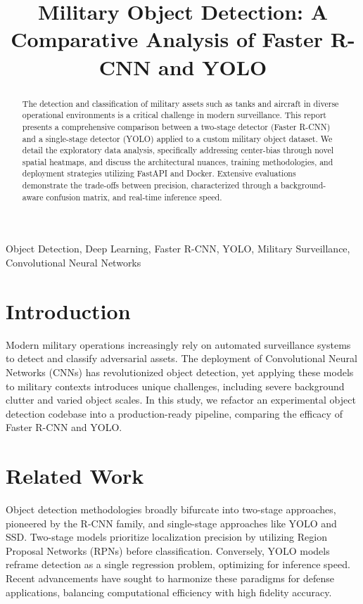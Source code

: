 \documentclass[conference]{IEEEtran}
\begin{document}
\title{Military Object Detection: A Comparative Analysis of Faster R-CNN and YOLO}

\author{
}

\maketitle

\begin{abstract}
The detection and classification of military assets such as tanks and aircraft in diverse operational environments is a critical challenge in modern surveillance. This report presents a comprehensive comparison between a two-stage detector (Faster R-CNN) and a single-stage detector (YOLO) applied to a custom military object dataset. We detail the exploratory data analysis, specifically addressing center-bias through novel spatial heatmaps, and discuss the architectural nuances, training methodologies, and deployment strategies utilizing FastAPI and Docker. Extensive evaluations demonstrate the trade-offs between precision, characterized through a background-aware confusion matrix, and real-time inference speed.
\end{abstract}

\begin{IEEEkeywords}
Object Detection, Deep Learning, Faster R-CNN, YOLO, Military Surveillance, Convolutional Neural Networks
\end{IEEEkeywords}

\section{Introduction}
Modern military operations increasingly rely on automated surveillance systems to detect and classify adversarial assets. The deployment of Convolutional Neural Networks (CNNs) has revolutionized object detection, yet applying these models to military contexts introduces unique challenges, including severe background clutter and varied object scales. In this study, we refactor an experimental object detection codebase into a production-ready pipeline, comparing the efficacy of Faster R-CNN and YOLO. 

\section{Related Work}
Object detection methodologies broadly bifurcate into two-stage approaches, pioneered by the R-CNN family, and single-stage approaches like YOLO and SSD. Two-stage models prioritize localization precision by utilizing Region Proposal Networks (RPNs) before classification. Conversely, YOLO models reframe detection as a single regression problem, optimizing for inference speed. Recent advancements have sought to harmonize these paradigms for defense applications, balancing computational efficiency with high fidelity accuracy.
\end{document}
